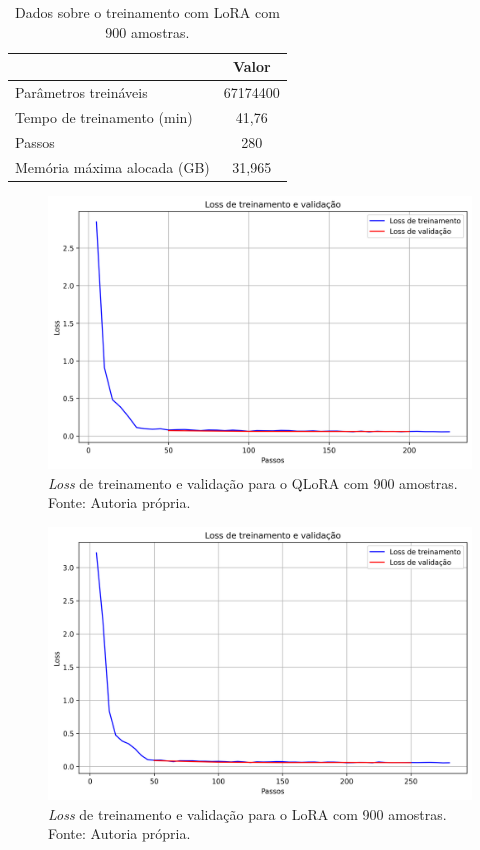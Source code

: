 \begin{table}[ht]
    \caption{\small Dados sobre o treinamento com \ac{LoRA} com 900 amostras.}
    \centering
    \begin{tabular}{l|c}
        \hline
                                    & Valor    \\ \hline
        Parâmetros treináveis       & 67174400 \\
        Tempo de treinamento (min)  & 41,76    \\
        Passos                      & 280      \\
        Memória máxima alocada (GB) & 31,965   \\ \hline
    \end{tabular}
    \label{tab:lora_1000_training}
\end{table}

\clearpage

\begin{figure}[ht]
    \centering
    \includegraphics[width=0.725\columnwidth,keepaspectratio]{images/loss_qlora_1000.png}
    \caption{\small \textit{Loss} de treinamento e validação para o \ac{QLoRA} com 900 amostras. Fonte: Autoria própria.}
    \label{fig:loss_qlora_1000}
\end{figure}

\begin{figure}[ht]
    \centering
    \includegraphics[width=0.725\columnwidth,keepaspectratio]{images/loss_lora_1000.png}
    \caption{\small \textit{Loss} de treinamento e validação para o \ac{LoRA} com 900 amostras. Fonte: Autoria própria.}
    \label{fig:loss_lora_1000}
\end{figure}

